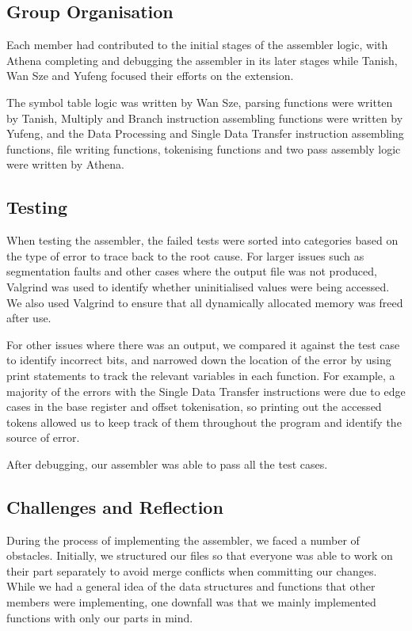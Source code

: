 \documentclass[a4paper,11pt]{article}
\begin{document}
\subsection{Group Organisation}
Each member had contributed to the initial stages of the assembler logic, with Athena completing and debugging the assembler in its later stages while Tanish, Wan Sze and Yufeng focused their efforts on the extension.

The symbol table logic was written by Wan Sze, parsing functions were written by Tanish, Multiply and Branch instruction assembling functions were written by Yufeng, and the Data Processing and Single Data Transfer instruction assembling functions, file writing functions, tokenising functions and two pass assembly logic were written by Athena.

\subsection{Testing}
When testing the assembler, the failed tests were sorted into categories based on the type of error to trace back to the root cause. For larger issues such as segmentation faults and other cases where the output file was not produced, Valgrind was used to identify whether uninitialised values were being accessed. We also used Valgrind to ensure that all dynamically allocated memory was freed after use. 

For other issues where there was an output, we compared it against the test case to identify incorrect bits, and narrowed down the location of the error by using print statements to track the relevant variables in each function. For example, a majority of the errors with the Single Data Transfer instructions were due to edge cases in the base register and offset tokenisation, so printing out the accessed tokens allowed us to keep track of them throughout the program and identify the source of error.

After debugging, our assembler was able to pass all the test cases.

\subsection{Challenges and Reflection}
During the process of implementing the assembler, we faced a number of obstacles. Initially, we structured our files so that everyone was able to work on their part separately to avoid merge conflicts when committing our changes. While we had a general idea of the data structures and functions that other members were implementing, one downfall was that we mainly implemented functions with only our parts in mind. 
\end{document}
